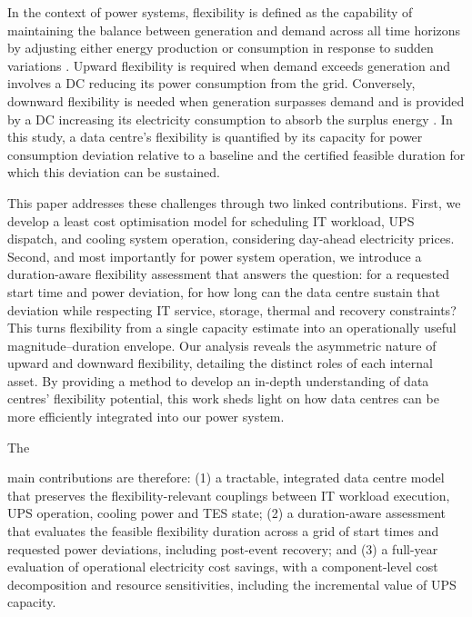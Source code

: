 \documentclass[lettersize,journal]{IEEEtran}
\providecommand{\DIFadd}[1]{{\color{blue}#1}}
\providecommand{\DIFaddbegin}{}
\providecommand{\DIFaddend}{}
\begin{document}
In the context of power systems, flexibility is defined as the capability of maintaining the balance between generation and demand across all time horizons  by adjusting either energy production or consumption in response to sudden variations \cite{Centrica2020LEM, EEAACER2023Flex, neso2025future, Nosair2015TSTE}. Upward flexibility is required when demand exceeds generation and involves a DC reducing its power consumption from the grid. Conversely, downward flexibility is needed when generation surpasses demand  and is provided by a DC increasing its electricity consumption to absorb the surplus energy \cite{Centrica2020LEM, NG2017SNAPS}. In this study, a data centre's flexibility is quantified by its capacity for power consumption deviation relative to a baseline  \DIFaddbegin \DIFadd{and the certified feasible }\DIFaddend duration for which this deviation can be sustained.

This paper addresses these challenges through two  \DIFaddbegin \DIFadd{linked }\DIFaddend contributions. First, we develop a least cost optimisation model for scheduling IT workload, UPS dispatch, and cooling system operation, considering day-ahead electricity prices. Second, \DIFaddbegin \DIFadd{and most importantly for power system operation, }\DIFaddend we introduce a  \DIFaddbegin \DIFadd{duration-aware flexibility assessment that answers the question: for a requested start time and power deviation, for how long can the data centre sustain that deviation while respecting IT service, storage, thermal and recovery constraints? This turns flexibility from a single capacity estimate into an operationally useful magnitude--duration envelope}\DIFaddend . Our analysis reveals the asymmetric nature of upward and downward flexibility, detailing the distinct roles of each internal asset. By providing a method to develop an in-depth understanding of data centres' flexibility potential, this work sheds light on how data centres can be more efficiently integrated into our power system.

The \DIFaddbegin \DIFadd{main contributions are therefore: (1) a tractable, integrated data centre model that preserves the flexibility-relevant couplings between IT workload execution, UPS operation, cooling power and TES state; (2) a duration-aware assessment that evaluates the feasible flexibility duration across a grid of start times and requested power deviations, including post-event recovery; and (3) a full-year evaluation of operational electricity cost savings, with a component-level cost decomposition and resource sensitivities, including the incremental value of UPS capacity.

}
\end{document}
